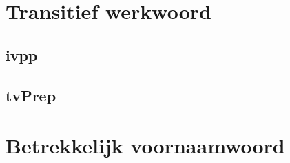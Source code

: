 \section{Transitief werkwoord}
\subsection{ivpp}
\subsection{tvPrep}


\section{Betrekkelijk voornaamwoord}
